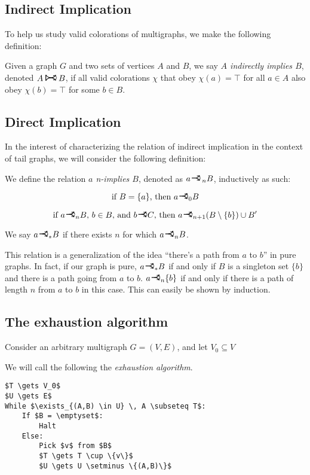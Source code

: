 \documentclass[11pt]{article}
\newcommand{\rightcurveor}{
\!
\mathrel{
  \begin{tikzpicture}[scale=0.8]
    \draw[thick,->] (0,0) arc (90:150:-2ex);
    \draw[thick,->] (0,0) arc (90:30:2ex);
    \draw[thick] (-1ex, 0) -- (0.1ex,0);
  \end{tikzpicture}
}\!
}
\newcommand{\Rightcurvearrow}{
\mathrel{
  \begin{tikzpicture}[scale=0.8]
    \draw[thick,->] (0,1ex) arc (30:150:-2ex);
    \draw[thick,->] (0,-1ex) arc (150:30:2ex);
    \draw[thick] (0, 1ex) -- (0, -1ex);
  \end{tikzpicture}
}
}
\begin{document}
\subsection{Indirect Implication}

To help us study valid colorations of multigraphs, we make the following definition:

Given a graph $G$ and two sets of vertices $A$ and $B$, we say \emph{$A$ indirectly implies $B$}, denoted $A \Rightcurvearrow B$, if all valid colorations $\chi$ that obey $\chi(a) = \top$ for all $a \in A$ also obey $\chi(b) = \top$ for some $b \in B$.

\subsection{Direct Implication}

In the interest of characterizing the relation of indirect implication in the context of tail graphs, we will consider the following definition:

We define the relation \emph{$a$ n-implies $B$}, denoted as $a \rightcurveor_{\,n} B$, inductively as such:

\[\text{if } B = \{a\} \text{, then } a \rightcurveor_0 B\]


\[\text{if } a \rightcurveor_n B \text{, } b \in B \text{, and } b \rightcurveor C \text{, then } a \rightcurveor_{n+1} (B \setminus \{b\}) \cup B'\]

We say $a \rightcurveor_* B$ if there exists $n$ for which $a \rightcurveor_n B$.

This relation is a generalization of the idea ``there's a path from $a$ to $b$'' in pure graphs. In fact, if our graph is pure, $a \rightcurveor_* B$ if and only if $B$ is a singleton set $\{b\}$ and there is a path going from $a$ to $b$. $a \rightcurveor_n \{b\}$ if and only if there is a path of length $n$ from $a$ to $b$ in this case. This can easily be shown by induction.

\subsection{The exhaustion algorithm}

Consider an arbitrary multigraph $G = (V,E)$, and let $V_0 \subseteq V$

We will call the following the \emph{exhaustion algorithm}.

\begin{minipage}{\linewidth}
\begin{lstlisting}[mathescape]
$T \gets V_0$
$U \gets E$
While $\exists_{(A,B) \in U} \, A \subseteq T$:
    If $B = \emptyset$:
        Halt
    Else:
        Pick $v$ from $B$
        $T \gets T \cup \{v\}$
        $U \gets U \setminus \{(A,B)\}$
\end{lstlisting}
\end{minipage}
\end{document}
